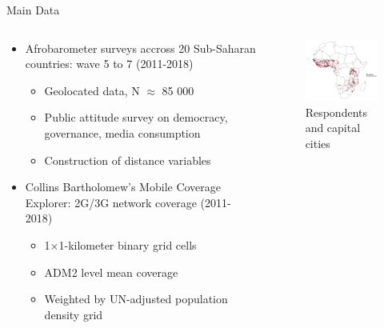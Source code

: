 \documentclass[10pt]{beamer}
\begin{document}
\begin{frame}{Main Data}
\begin{columns}
\begin{column}{0.5\textwidth}
\begin{itemize}\setlength\itemsep{1em}
\item Afrobarometer surveys accross 20 Sub-Saharan countries: wave 5 to 7 (2011-2018)
\begin{itemize}
    \item Geolocated data, N $\approx$ 85 000
    \item Public attitude survey on democracy, governance, media consumption
    \item Construction of distance variables
\end{itemize}
\item Collins Bartholomew’s Mobile Coverage Explorer: 2G/3G network coverage (2011-2018)
\begin{itemize}
    \item 1×1-kilometer binary grid cells
    \item ADM2 level mean coverage
    \item Weighted by UN-adjusted population density grid
\end{itemize}
\end{itemize}

\end{column}
\begin{column}{0.5\textwidth}

\begin{figure}
    \centering
    \caption{Respondents and capital cities}
    \includegraphics[width=6cm]{carte afrique echantillon total.png}
\end{figure}
\end{column}
    \end{columns}
    

\end{frame}
\end{document}
